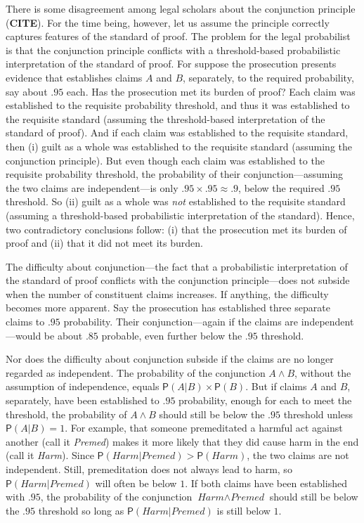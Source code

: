 \documentclass[
  10pt,
  dvipsnames,enabledeprecatedfontcommands]{scrartcl}
\newcommand{\et}{\wedge}
\newcommand{\pr}[1]{\mathsf{P}(#1)}
\begin{document}
There is some disagreement among legal scholars about the conjunction
principle (\textbf{CITE}). For the time being, however, let us assume
the principle correctly captures features of the standard of proof. The
problem for the legal probabilist is that the conjunction principle
conflicts with a threshold-based probabilistic interpretation of the
standard of proof. For suppose the prosecution presents evidence that
establishes claims \(A\) and \(B\), separately, to the required
probability, say about \(.95\) each. Has the prosecution met its burden
of proof? Each claim was established to the requisite probability
threshold, and thus it was established to the requisite standard
(assuming the threshold-based interpretation of the standard of proof).
And if each claim was established to the requisite standard, then (i)
guilt as a whole was established to the requisite standard (assuming the
conjunction principle). But even though each claim was established to
the requisite probability threshold, the probability of their
conjunction---assuming the two claims are independent---is only
\(.95\times .95 \approx .9\), below the required \(.95\) threshold. So
(ii) guilt as a whole was \textit{not} established to the requisite
standard (assuming a threshold-based probabilistic interpretation of the
standard). Hence, two contradictory conclusions follow: (i) that the
prosecution met its burden of proof and (ii) that it did not meet its
burden.

The difficulty about conjunction---the fact that a probabilistic
interpretation of the standard of proof conflicts with the conjunction
principle---does not subside when the number of constituent claims
increases. If anything, the difficulty becomes more apparent. Say the
prosecution has established three separate claims to \(.95\)
probability. Their conjunction---again if the claims are
independent---would be about \(.85\) probable, even further below the
\(.95\) threshold.

Nor does the difficulty about conjunction subside if the claims are no
longer regarded as independent. The probability of the conjunction
\(A \et B\), without the assumption of independence, equals
\(\pr{A \vert B} \times \pr{B}\). But if claims \(A\) and \(B\),
separately, have been established to \(.95\) probability, enough for
each to meet the threshold, the probability of \(A \et B\) should still
be below the \(.95\) threshold unless \(\pr{A \vert B}=1\). For example,
that someone premeditated a harmful act against another (call it
\textit{Premed}) makes it more likely that they did cause harm in the
end (call it \textit{Harm}). Since
\(\pr{\textit{Harm} \vert \textit{Premed}} > \pr{\textit{Harm}}\), the
two claims are not independent. Still, premeditation does not always
lead to harm, so \(\pr{\textit{Harm} \vert \textit{Premed}}\) will often
be below \(1\). If both claims have been established with \(.95\), the
probability of the conjunction \(\textit{Harm} \et \textit{Premed}\)
should still be below the \(.95\) threshold so long as
\(\pr{\textit{Harm} \vert \textit{Premed}}\) is still below \(1\).
\end{document}
